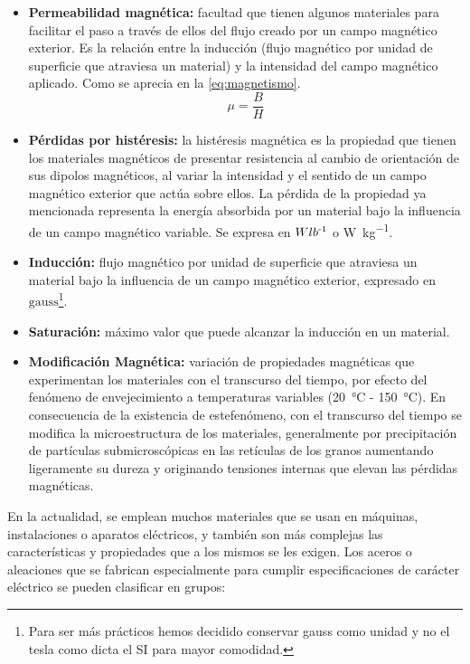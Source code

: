 \documentclass[12pt,a4paper]{article}
\begin{document}
\begin{itemize}
    \item \textbf{Permeabilidad magnética:} facultad que tienen algunos materiales para facilitar el paso a través de ellos del flujo creado por un campo magnético exterior. Es la relación entre la inducción (flujo magnético por unidad de superficie que atraviesa un material) y la intensidad del campo magnético aplicado. Como se aprecia en la \autoref{eq:magnetismo}.
    \begin{equation} \label{eq:magnetismo}
        \mu  = \frac{B}{H}
    \end{equation}
    \item \textbf{Pérdidas por histéresis:} la histéresis magnética es la propiedad que tienen los materiales magnéticos de presentar resistencia al cambio de orientación de sus dipolos magnéticos, al variar la intensidad y el sentido de un campo magnético exterior que actúa sobre ellos. La pérdida de la propiedad ya mencionada representa la energía absorbida por un material bajo la influencia de un campo magnético variable. Se expresa en $Wlb\textsuperscript{-1}$ o \si{\watt\per\kilogram}.
    \item \textbf{Inducción:} flujo magnético por unidad de superficie que atraviesa un material bajo la influencia de un campo magnético exterior, expresado en $\mathrm{gauss}$\footnote{Para ser más prácticos hemos decidido conservar gauss como unidad y no el tesla como dicta el SI para mayor comodidad.}.
    \item \textbf{Saturación:} máximo valor que puede alcanzar la inducción en un material.
    \item \textbf{Modificación Magnética:} variación de propiedades magnéticas que experimentan los materiales con el transcurso del tiempo, por efecto del fenómeno de envejecimiento a temperaturas variables (\SI{20}{\celsius} - \SI{150}{\celsius}). En consecuencia de la existencia de estefenómeno, con el transcurso del tiempo se modifica la microestructura de los materiales, generalmente por precipitación de partículas submicroscópicas en las retículas de los granos aumentando ligeramente su dureza y originando tensiones internas que elevan las  pérdidas magnéticas.
\end{itemize}

En la actualidad, se emplean muchos materiales que se usan en máquinas, instalaciones o aparatos eléctricos, y también son más complejas las características y propiedades que a los mismos se les exigen.
Los aceros o aleaciones que se fabrican especialmente para cumplir especificaciones de carácter eléctrico se pueden clasificar en grupos:
\end{document}
